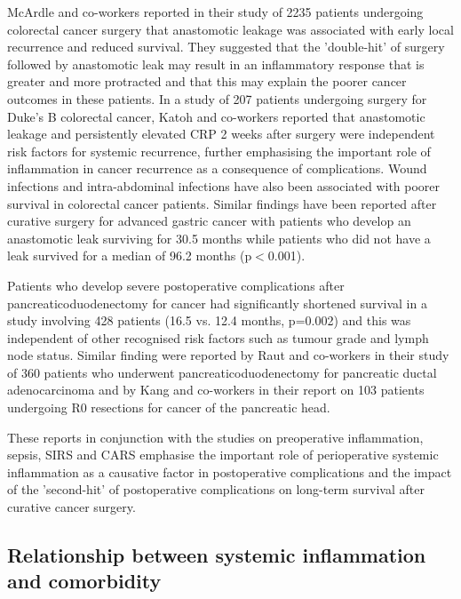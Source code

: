 McArdle and co-workers reported in their study of 2235 patients undergoing colorectal cancer surgery that anastomotic leakage was associated with early local recurrence and reduced survival. They suggested that the 'double-hit' of surgery followed by anastomotic leak may result in an inflammatory response that is greater and more protracted and that this may explain the poorer cancer outcomes in these patients.\parencite{mcardle_impact_2005} In a study of 207 patients undergoing surgery for Duke's B colorectal cancer, Katoh and co-workers reported that anastomotic leakage and persistently elevated CRP 2 weeks after surgery were independent risk factors for systemic recurrence, further emphasising the important role of inflammation in cancer recurrence as a consequence of complications.\parencite{katoh_anastomotic_2011} Wound infections and intra-abdominal infections have also been associated with poorer survival in colorectal cancer patients.\parencite{nespoli_impact_2006} Similar findings have been reported after curative surgery for advanced gastric cancer with patients who develop an anastomotic leak surviving for 30.5 months while patients who did not have a leak survived for a median of 96.2 months (p$<$0.001). \parencite{yoo_negative_2011} 

Patients who develop severe postoperative complications after pancreaticoduodenectomy for cancer had significantly shortened survival in a study involving 428 patients (16.5 vs. 12.4 months, p=0.002) and this was independent of other recognised risk factors such as tumour grade and lymph node status. \parencite{kamphues_postoperative_2011} Similar finding were reported by Raut and co-workers in their study of 360 patients who underwent pancreaticoduodenectomy for pancreatic ductal adenocarcinoma \parencite{raut_impact_2007} and by Kang and co-workers in their report on 103 patients undergoing R0 resections for cancer of the pancreatic head. \parencite{kang_detrimental_2009}

These reports in conjunction with the studies on preoperative inflammation, sepsis, SIRS and CARS emphasise the important role of perioperative systemic inflammation as a causative factor in postoperative complications and the impact of the 'second-hit' of postoperative complications on long-term survival after curative cancer surgery.

\subsection{Relationship between systemic inflammation and comorbidity}

